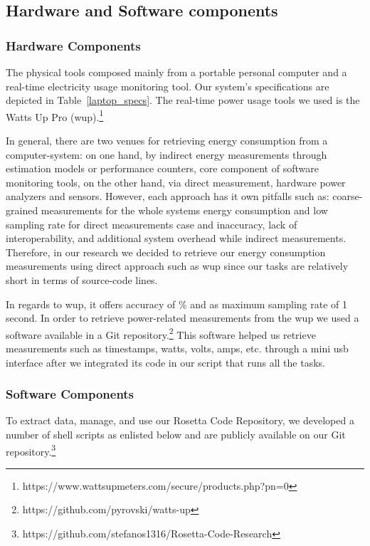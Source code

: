 \subsection{Hardware and Software components}

\subsubsection{Hardware Components}
The physical tools composed mainly from a portable personal 
computer and a real-time electricity usage monitoring tool.
Our system's specifications are depicted in Table~\ref{laptop_specs}. 
The real-time power usage tools we used is the Watts Up Pro ({\sc wup}).\footnote{https://www.wattsupmeters.com/secure/products.php?pn=0} 

In general, there are two venues for retrieving energy consumption 
from a computer-system: on one hand, by indirect energy measurements 
through estimation models or performance counters, core component 
of software monitoring tools, on the other hand, via direct measurement, 
hardware power analyzers and sensors.  
However, each approach has it own pitfalls such as: coarse-grained 
measurements for the whole systems energy consumption and low sampling 
rate for direct measurements case and inaccuracy, lack of interoperability, 
and additional system overhead while indirect measurements. 
Therefore, in our research we decided to retrieve our energy consumption 
measurements using direct approach such as {\sc wup} since our 
tasks are relatively short in terms of source-code lines.


In regards to {\sc wup}, it offers accuracy of \% and 
as maximum sampling rate of 1 second. 
In order to retrieve power-related measurements from the {\sc wup} 
we used a software available in a Git repository.\footnote{https://github.com/pyrovski/watts-up}
This software helped us retrieve measurements such as timestamps, 
watts, volts, amps, etc. through a mini {\sc usb} interface after 
we integrated its code in our script that runs all the tasks.

\subsubsection{Software Components} \label{software_components}
To extract data, manage, and use our Rosetta Code Repository, 
we developed a number of shell scripts as enlisted below and are 
publicly available on our Git repository.\footnote{https://github.com/stefanos1316/Rosetta-Code-Research} 

